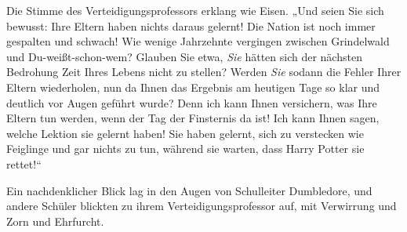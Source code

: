 Die Stimme des Verteidigungsprofessors erklang wie Eisen.
„Und seien Sie sich bewusst: Ihre Eltern haben nichts daraus gelernt! Die Nation ist noch immer gespalten und schwach! Wie wenige Jahrzehnte vergingen zwischen Grindelwald und Du-weißt-schon-wem? Glauben Sie etwa, \emph{Sie} hätten sich der nächsten Bedrohung Zeit Ihres Lebens nicht zu stellen? Werden \emph{Sie} sodann die Fehler Ihrer Eltern wiederholen, nun da Ihnen das Ergebnis am heutigen Tage so klar und deutlich vor Augen geführt wurde? Denn ich kann Ihnen versichern, was Ihre Eltern tun werden, wenn der Tag der Finsternis da ist! Ich kann Ihnen sagen, welche Lektion sie gelernt haben! Sie haben gelernt, sich zu verstecken wie Feiglinge und gar nichts zu tun, während sie warten, dass Harry Potter sie rettet!“

Ein nachdenklicher Blick lag in den Augen von Schulleiter Dumbledore, und andere Schüler blickten zu ihrem Verteidigungsprofessor auf, mit Verwirrung und Zorn und Ehrfurcht.

